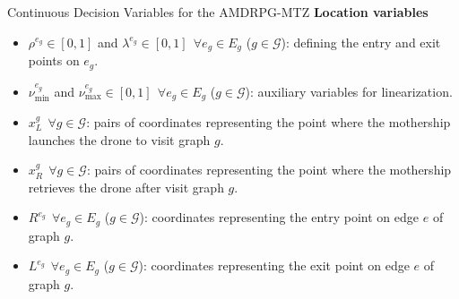 \documentclass[slidestop,usepdftitle=false,10pt]{beamer}
\begin{document}
	\begin{frame}{Continuous Decision Variables for the AMDRPG-MTZ}
	\textbf{Location variables}
	\begin{itemize}
        \item $\rho^{e_g} \in [0,1]$ and $\lambda^{e_g} \in [0,1] \:\: \forall e_g \in E_g$ ($g \in \mathcal{G}$): defining the entry and exit points on $e_g$.
        \item $\nu_\text{min}^{e_g}$ and $\nu_\text{max}^{e_g} \in [0,1] \:\: \forall e_g \in E_g$ ($g \in \mathcal{G}$): auxiliary variables for linearization.
        \item $x_L^g \:\: \forall g \in \mathcal{G}$: pairs of coordinates representing the point where the mothership launches the drone to visit graph $g$.
        \item $x_R^g \:\: \forall g \in \mathcal{G}$: pairs of coordinates representing the point where the mothership retrieves the drone after visit graph $g$.
        \item $R^{e_g} \:\: \forall e_g \in E_g$ ($g \in \mathcal{G}$): coordinates representing the entry point on edge $e$ of graph $g$.
        \item $L^{e_g} \:\: \forall e_g \in E_g$ ($g \in \mathcal{G}$): coordinates representing the exit point on edge $e$ of graph $g$.
    \end{itemize}
    \end{frame}
    
\end{document}
